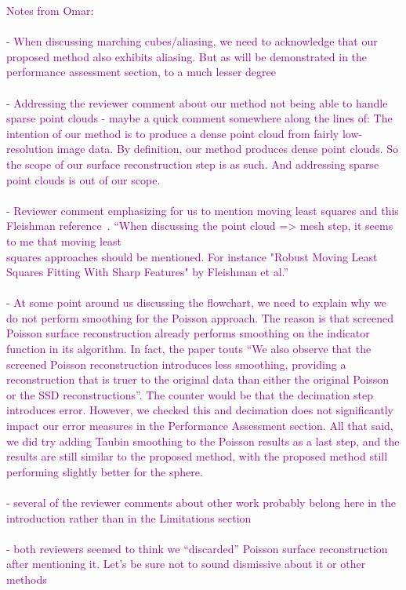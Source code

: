 \textcolor{purple}{
Notes from Omar:\\ \\
- When discussing marching cubes/aliasing, we need to acknowledge that our proposed method also exhibits aliasing. But as will be demonstrated in the performance assessment section, to a much lesser degree\\ \\
- Addressing the reviewer comment about our method not being able to handle sparse point clouds - maybe a quick comment somewhere along the lines of: The intention of our method is to produce a dense point cloud from fairly low-resolution image data. By definition, our method produces dense point clouds. So the scope of our surface reconstruction step is as such. And addressing sparse point clouds is out of our scope.\\ \\
- Reviewer comment emphasizing for us to mention moving least squares and this Fleishman reference~\cite{fleishman2005}. ``When discussing the point cloud => mesh step, it seems to me that moving least\\
squares approaches should be mentioned. For instance "Robust Moving Least
Squares Fitting With Sharp Features" by Fleishman et al.''\\ \\
- At some point around us discussing the flowchart, we need to explain why we do not perform smoothing for the Poisson approach. The reason is that screened Poisson surface reconstruction already performs smoothing on the indicator function in its algorithm. In fact, the paper touts ``We also observe that the screened Poisson reconstruction introduces less smoothing, providing a reconstruction that is truer to the original data than either the original Poisson or the SSD reconstructions''. The counter would be that the decimation step introduces error. However, we checked this and decimation does not significantly impact our error measures in the Performance Assessment section. All that said, we did try adding Taubin smoothing to the Poisson results as a last step, and the results are still similar to the proposed method, with the proposed method still performing slightly better for the sphere. \\ \\
- several of the reviewer comments about other work probably belong here in the introduction rather than in the Limitations section \\ \\
- both reviewers seemed to think we ``discarded'' Poisson surface reconstruction after mentioning it. Let's be sure not to sound dismissive about it or other methods}